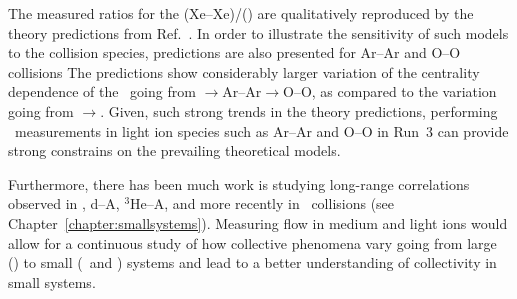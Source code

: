 The measured ratios for the \vn(Xe--Xe)/\vn(\pbpb) are qualitatively reproduced 
  by the theory predictions from Ref.~\cite{Giacalone:2017dud}.
In order to illustrate the sensitivity of such models to the collision species, 
  predictions are also presented for Ar--Ar and O--O collisions
The predictions show considerably larger variation of the centrality dependence
  of the \vn\ going from \xexe$\rightarrow$Ar--Ar$\rightarrow$O--O, as compared to
  the variation going from \pbpb$\rightarrow$\xexe.
Given, such strong trends in the theory predictions, performing \vn\ measurements 
  in light ion species such as Ar--Ar and O--O in Run~3 can provide strong 
  constrains on the prevailing theoretical models.

Furthermore, there has been much work is studying long-range correlations
  observed in \pA, d--A, $^{3}\mathrm{He}$--A, and more recently in 
  \pp\ collisions (see Chapter~\ref{chapter:smallsystems}).
Measuring flow in medium and light ions would allow for a continuous study 
  of how collective phenomena vary going from large (\pbpb) to small 
  (\pA\ and \pp) systems and lead to a better understanding of collectivity
  in small systems.


